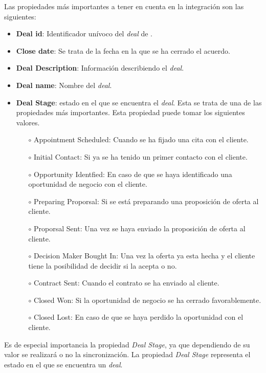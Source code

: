 		Las propiedades más importantes a tener en cuenta en la integración son las siguientes:
		\begin{itemize}
			\item \textbf{Deal id}: Identificador unívoco del \textit{deal} de \hs.
			\item \textbf{Close date}: Se trata de la fecha en la que se ha cerrado el acuerdo.
			\item \textbf{Deal Description}: Información describiendo el \textit{deal}.
			\item \textbf{Deal name}: Nombre del \textit{deal}.
			\item \textbf{Deal Stage}: estado en el que se encuentra el \textit{deal}. Esta se trata de una de las propiedades más importantes. 
				Esta propiedad puede tomar los siguientes valores.
				\begin{itemize}
					\item[$\circ$] Appointment Scheduled: Cuando se ha fijado una cita con el cliente.
					\item[$\circ$] Initial Contact: Si ya se ha tenido un primer contacto con el cliente.
					\item[$\circ$] Opportunity Identfied: En caso de que se haya identificado una oportunidad de negocio con el cliente.
					\item[$\circ$] Preparing Proporsal: Si se está preparando una proposición de oferta al cliente.
					\item[$\circ$] Proporsal Sent: Una vez se haya enviado la proposición de oferta al cliente.
					\item[$\circ$] Decision Maker Bought In: Una vez la oferta ya esta hecha y el cliente tiene la posibilidad de decidir si la acepta o no.
					\item[$\circ$] Contract Sent: Cuando el contrato se ha enviado al cliente.
					\item[$\circ$] Closed Won: Si la oportunidad de negocio se ha cerrado favorablemente.
					\item[$\circ$] Closed Lost: En caso de que se haya perdido la oportunidad con el cliente.
				\end{itemize}
		\end{itemize}
		
		
		Es de especial importancia la propiedad \textit{Deal Stage}, ya que dependiendo de su valor se realizará o no la sincronización.
		La propiedad \textit{Deal Stage} representa el estado en el que se encuentra un \textit{deal}.
		
		
		
		

